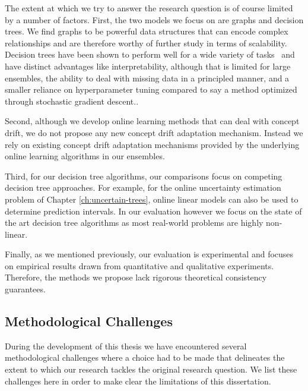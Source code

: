 The extent at which we try to answer the research question is of course limited by
a number of factors. First, the two models we focus on are graphs and decision
trees. We find graphs to be powerful data structures that can encode complex
relationships and are therefore worthy of further study in terms of scalability.
Decision trees have been shown to perform well for a wide variety of tasks~\cite{hundreds-classifiers}
and have distinct advantages like interpretability, although that is limited
for large ensembles, the ability to deal with missing data in a principled
manner, and a smaller reliance on hyperparameter tuning compared to say
a method optimized through stochastic gradient descent..

Second, although we develop online learning methods that can deal
with concept drift, we do not propose any new concept drift adaptation
mechanism. Instead we rely on existing concept drift adaptation mechanisms
provided by the underlying online learning algorithms in our ensembles.

Third, for our decision tree algorithms, our comparisons focus on
competing decision tree approaches. For example, for the online uncertainty
estimation problem of Chapter \ref{ch:uncertain-trees}, online linear
models can also be used to determine prediction intervals. In our evaluation
however we focus on the state of the art decision tree algorithms as
most real-world problems are highly non-linear.

Finally, as we mentioned previously, our evaluation is experimental
and focuses on empirical results drawn from quantitative and qualitative
experiments. Therefore, the methods we propose lack rigorous theoretical consistency guarantees.

\subsection*{Methodological Challenges}

During the development of this thesis we have encountered several methodological
challenges where a choice had to be made that delineates the extent to which
our research tackles the original research question. We list these challenges
here in order to make clear the limitations of this dissertation.


